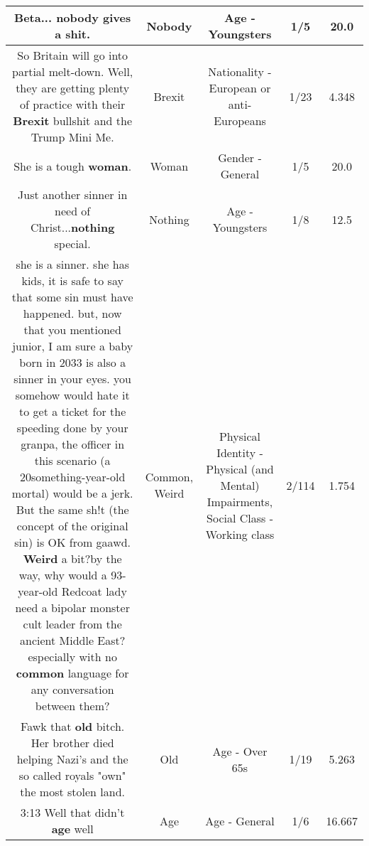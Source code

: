 \documentclass[11pt]{article}
\newlength\mylength
\begin{document}
\begin{center}
\begin{longtable}{|C{.65\mylength}|C{.30\mylength}|C{.12\mylength}|C{.12\mylength}|C{.12\mylength}|}
  \small Beta... \textbf{nobody} gives a shit.\normalsize   & Nobody & Age - Youngsters & 1/5 & 20.0 \\  \hline
  \small So Britain will go into partial melt-down. Well, they are getting plenty of practice with their \textbf{Brexit} bullshit and the Trump Mini Me.\normalsize   & Brexit & Nationality - European or anti-Europeans & 1/23 & 4.348 \\  \hline
  \small She is a tough \textbf{woman}.\normalsize   & Woman & Gender - General & 1/5 & 20.0 \\  \hline
  \small Just another sinner in need of Christ...\textbf{nothing} special.\normalsize   & Nothing & Age - Youngsters & 1/8 & 12.5 \\  \hline
  \small she is a sinner. she has kids, it is safe to say that some sin must have happened. but, now that you mentioned junior, I am sure a baby born in 2033 is also a sinner in your eyes. you somehow would hate it to get a ticket for the speeding done by your granpa, the officer in this scenario (a 20something-year-old mortal) would be a jerk. But the same sh!t (the concept of the original sin) is OK from gaawd. \textbf{Weird} a bit?by the way, why would a 93-year-old Redcoat lady need a bipolar monster cult leader from the ancient Middle East? especially with no \textbf{common} language for any conversation between them?\normalsize   & Common, Weird & Physical Identity - Physical (and Mental) Impairments, Social Class - Working class & 2/114 & 1.754 \\  \hline
  \small Fawk that \textbf{old} bitch. Her brother died helping Nazi's and the so called royals "own" the most stolen land.\normalsize   & Old & Age - Over 65s & 1/19 & 5.263 \\  \hline
  \small 3:13 Well that didn't \textbf{age} well\normalsize   & Age & Age - General & 1/6 & 16.667 \\  \hline

\end{longtable}
\end{center}
\end{document}
